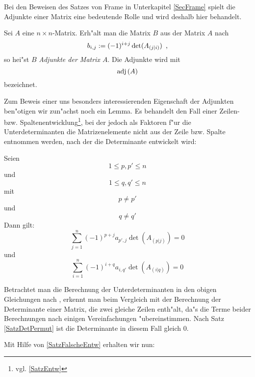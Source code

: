 
\label{SecAdj}

Bei den Beweisen des Satzes von Frame in Unterkapitel \ref{SecFrame} 
spielt die Adjunkte einer Matrix eine bedeutende Rolle und wird
deshalb hier behandelt.

\MyBeginDef
\label{DefAdj}
    Sei $A$ eine $n \times n$-Matrix.
    Erh"alt man die Matrix $B$ aus der Matrix $A$ nach
    \[
        b_{i,j} := (-1)^{i+j} \det(A_{(j|i)}) \mbox{\hspace{0.5em},}
    \] so hei"st $B$ {\em Adjunkte der Matrix $A$}. Die Adjunkte wird mit
    \[ \mbox{\rm adj} \,(A) \] bezeichnet.
\MyEndDef

Zum Beweis einer uns besonders interessierenden Eigenschaft der Adjunkten
ben"otigen wir zun"achst noch ein Lemma. Es
behandelt den Fall einer Zeilen- bzw. Spaltenentwicklung\footnote{ vgl. 
\ref{SatzEntw} }, bei der jedoch
als Faktoren f"ur die Unterdeterminanten die Matrizenelemente nicht aus
der Zeile bzw. Spalte entnommen werden, nach der die Determinante 
entwickelt wird:

\begin{lemma}
\label{SatzFalscheEntw}
    Seien \[ 1 \leq p,p' \leq n \] und \[ 1 \leq q,q' \leq n \] mit
    \[ p \neq p' \] und \[ q \neq q' \] Dann gilt:
    \[ \sum_{j=1}^n (-1)^{p+j} a_{p',j} \det(A_{(p|j)}) = 0 \] und
    \[ \sum_{i=1}^n (-1)^{i+q} a_{i,q'} \det(A_{(i|q)}) = 0 \]
\end{lemma}
\begin{beweis}
    Betrachtet man die Berechnung der Unterdeterminanten in den obigen
    Gleichungen nach , erkennt man beim
    Vergleich mit der Berechnung der Determinante einer Matrix, die
    zwei gleiche Zeilen enth"alt, da"s die Terme beider Berechnungen 
    nach einigen Vereinfachungen "ubereinstimmen. Nach Satz
    \ref{SatzDetPermut} ist die Determinante in diesem Fall gleich $0$.
\end{beweis}

Mit Hilfe von \ref{SatzFalscheEntw} erhalten wir nun:

